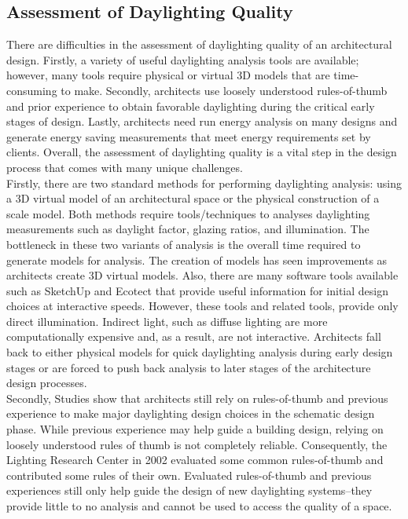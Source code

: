   \subsection{Assessment of Daylighting Quality}

    There are difficulties in the assessment of daylighting quality of an architectural design.
    Firstly, a variety of useful daylighting analysis tools are available; however, many tools require physical or virtual 3D models that are time-consuming to make.
    Secondly, architects use loosely understood rules-of-thumb and prior experience to obtain favorable daylighting during the critical early stages of design.
    Lastly, architects need run energy analysis on many designs and generate energy saving measurements that meet energy requirements set by clients.
    Overall, the assessment of daylighting quality is a vital step in the design process that comes with many unique challenges. \\

    Firstly, there are two standard methods for performing daylighting analysis: using a 3D virtual model of an architectural space or the physical construction of a scale model.
    Both methods require tools/techniques to analyses daylighting measurements such as daylight factor, glazing ratios, and illumination.
    The bottleneck in these two variants of analysis is the overall time required to generate models for analysis. The creation of models has seen improvements as architects create 3D virtual models. 
    Also, there are many software tools available such as SketchUp and Ecotect that provide useful information for initial design choices at interactive speeds.
    However, these tools and related tools, provide only direct illumination. Indirect light, such as diffuse lighting are more computationally expensive and, as a result, are not interactive\cite{Yancy}.
    Architects fall back to either physical models for quick daylighting analysis during early design stages or are forced to push back analysis to later stages of the architecture design processes.\\

    Secondly, Studies show that architects still rely on rules-of-thumb and previous experience to make major daylighting design choices in the schematic design phase\cite{Galasiu}.
    While previous experience may help guide a building design, relying on loosely understood rules of thumb is not completely reliable.
    Consequently, the Lighting Research Center in 2002 evaluated some common rules-of-thumb and contributed some rules of their own\cite{Leslie}.
    Evaluated rules-of-thumb and previous experiences still only help guide the design of new daylighting systems--they provide little to no analysis and cannot be used to access the quality of a space.\\

